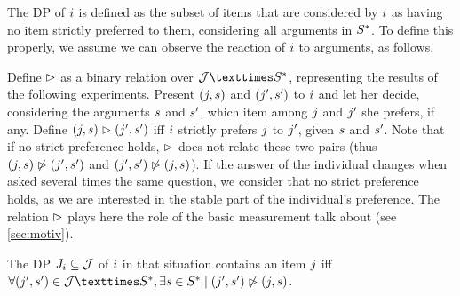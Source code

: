 \documentclass[version=3.21, pagesize, twoside=off, bibliography=totoc, DIV=calc, fontsize=12pt, a4paper, french, english]{scrartcl}
\begin{document}
The \ac{DP} of $i$ is defined as the subset of items that are considered by $i$ as having no item strictly preferred to them, considering all arguments in $S^*$. To define this properly, we assume we can observe the reaction of $i$ to arguments, as follows. 

Define $\vartriangleright$ as a binary relation over $\allitems × \allargs$, representing the results of the following experiments. Present $(j, s)$ and $(j', s')$ to $i$ and let her decide, considering the arguments $s$ and $s'$, which item among $j$ and $j'$ she prefers, if any. 
Define $(j, s) \vartriangleright (j', s')$ iff $i$ strictly prefers $j$ to $j'$, given $s$ and $s'$. Note that if no strict preference holds, $\vartriangleright$ does not relate these two pairs (thus $(j, s) \not\vartriangleright (j', s')$ and $(j', s') \not\vartriangleright (j, s)$). If the answer of the individual changes when asked several times the same question, we consider that no strict preference holds, as we are interested in the stable part of the individual’s preference.
The relation $\vartriangleright$ plays here the role of the basic measurement \citeauthor{von_neumann_theory_1944} talk about (see \cref{sec:motiv}).

The \ac{DP} $J_i \subseteq \mathcal{J}$ of $i$ in that situation contains an item $j$ iff $\forall (\itm', \ar') \in \allitems × \allargs, \exists \ar \in \allargs \suchthat (\itm', \ar') \nibeats (\itm, \ar)$.
\end{document}

